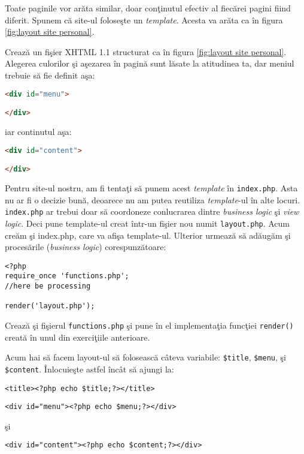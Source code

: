 Toate paginile vor
arăta similar, doar conţinutul efectiv al fiecărei pagini fiind diferit. Spunem că site-ul
foloseşte un \textit{template}. Acesta va arăta ca în figura \ref{fig:layout site personal}.


\begin{Exercise}[title={Crează template}]
Crează un fişier XHTML 1.1 structurat ca
în figura \ref{fig:layout site personal}. Alegerea culorilor şi aşezarea
în pagină sunt lăsate la atitudinea ta, dar meniul trebuie să fie
definit aşa:
\begin{lstlisting}[language=html]
<div id="menu">

</div>
\end{lstlisting}
iar continutul aşa:
\begin{lstlisting}[language=html]
<div id="content">

</div>
\end{lstlisting}
\end{Exercise}

Pentru site-ul nostru,
am fi tentaţi să punem acest \textit{template} în \texttt{index.php}.
Asta nu ar fi o decizie bună, deoarece nu am putea reutiliza \textit{template}-ul
în alte locuri. \texttt{index.php} ar trebui doar să coordoneze
conlucrarea dintre \textit{business logic} şi \textit{view logic}.
Deci pune template-ul creat într-un fişier nou numit \texttt{layout.php}.
Acum creăm şi index.php, care va afişa template-ul. Ulterior urmează să adăugăm
şi procesările (\textit{business logic}) corespunzătoare:
\begin{lstlisting}[title=index.php]
<?php
require_once 'functions.php';
//here be processing

render('layout.php');
\end{lstlisting}
Crează şi fişierul \texttt{functions.php} şi pune
în el implementaţia funcţiei \texttt{render()} creată
în unul din exerciţiile anterioare.

Acum hai să facem layout-ul să folosească câteva variabile:
\texttt{\$title}, \texttt{\$menu}, şi \texttt{\$content}.
Înlocuieşte astfel încât să ajungi la:
\begin{lstlisting}[numbers=none]
<title><?php echo $title;?></title>
\end{lstlisting}
\begin{lstlisting}[numbers=none]
<div id="menu"><?php echo $menu;?></div>
\end{lstlisting}
şi
\begin{lstlisting}[numbers=none]
<div id="content"><?php echo $content;?></div>
\end{lstlisting}

